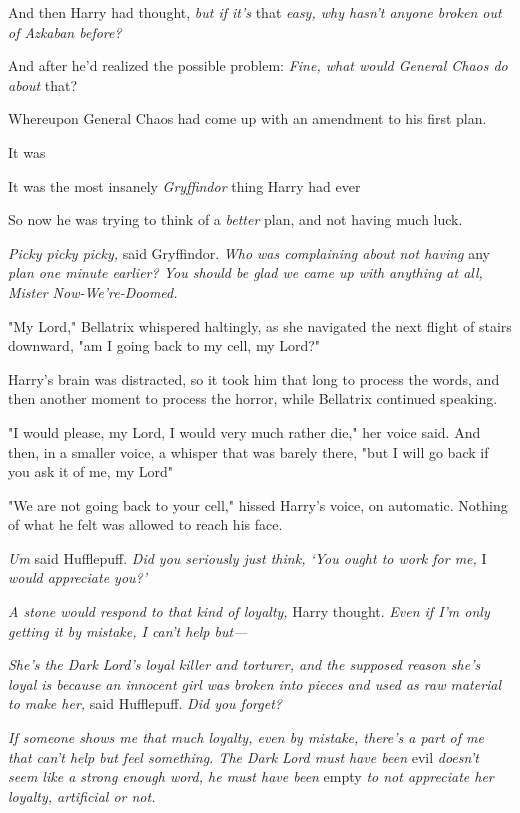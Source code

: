 And then Harry had thought, \emph{but if it's} that \emph{easy, why hasn't
anyone broken out of Azkaban before?}

And after he'd realized the possible problem: \emph{Fine, what would General
Chaos do about} that?

Whereupon General Chaos had come up with an amendment to his first plan.

It was{\el}

It was the most insanely \emph{Gryffindor} thing Harry had ever{\el}

So now he was trying to think of a \emph{better} plan, and not having much luck.

\emph{Picky picky picky,} said Gryffindor. \emph{Who was complaining about not
having} any \emph{plan one minute earlier? You should be glad we came up with
anything at all, Mister Now-We're-Doomed.}

"My Lord," Bellatrix whispered haltingly, as she navigated the next flight of
stairs downward, "am I going back to my cell, my Lord?"

Harry's brain was distracted, so it took him that long to process the words,
and then another moment to process the horror, while Bellatrix continued
speaking.

"I would{\el} please, my Lord, I would very much rather die," her voice
said. And then, in a smaller voice, a whisper that was barely there, "but I
will go back if you ask it of me, my Lord{\el}"

"We are not going back to your cell," hissed Harry's voice, on automatic.
Nothing of what he felt was allowed to reach his face.

\emph{Um{\el}} said Hufflepuff. \emph{Did you seriously just think, `You
ought to work for me,} I \emph{would appreciate you?'}

\emph{A stone would respond to that kind of loyalty,} Harry thought. \emph{Even
if I'm only getting it by mistake, I can't help but---}

\emph{She's the Dark Lord's loyal killer and torturer, and the supposed reason
she's loyal is because an innocent girl was broken into pieces and used as raw
material to make her,} said Hufflepuff. \emph{Did you forget?}

\emph{If someone shows me that much loyalty, even by mistake, there's a part of
me that can't help but feel something. The Dark Lord must have been{\el}}
evil \emph{doesn't seem like a strong enough word, he must have been}
empty\emph{{\el} to not appreciate her loyalty, artificial or not.}

